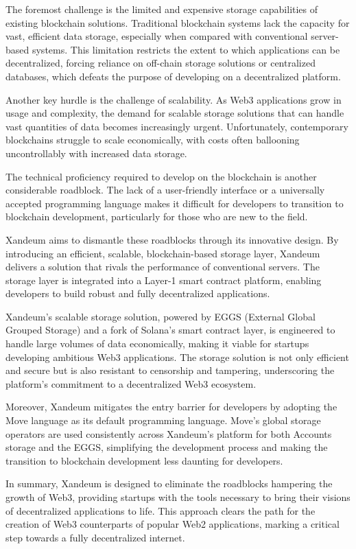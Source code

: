 \documentclass[11 pt]{article}   	%
\begin{document}
The foremost challenge is the limited and expensive storage capabilities of existing blockchain solutions. Traditional blockchain systems lack the capacity for vast, efficient data storage, especially when compared with conventional server-based systems. This limitation restricts the extent to which applications can be decentralized, forcing reliance on off-chain storage solutions or centralized databases, which defeats the purpose of developing on a decentralized platform.

Another key hurdle is the challenge of scalability. As Web3 applications grow in usage and complexity, the demand for scalable storage solutions that can handle vast quantities of data becomes increasingly urgent. Unfortunately, contemporary blockchains struggle to scale economically, with costs often ballooning uncontrollably with increased data storage.

The technical proficiency required to develop on the blockchain is another considerable roadblock. The lack of a user-friendly interface or a universally accepted programming language makes it difficult for developers to transition to blockchain development, particularly for those who are new to the field.

Xandeum aims to dismantle these roadblocks through its innovative design. By introducing an efficient, scalable, blockchain-based storage layer, Xandeum delivers a solution that rivals the performance of conventional servers. The storage layer is integrated into a Layer-1 smart contract platform, enabling developers to build robust and fully decentralized applications.

Xandeum's scalable storage solution, powered by EGGS (External Global Grouped Storage) and a fork of Solana's smart contract layer, is engineered to handle large volumes of data economically, making it viable for startups developing ambitious Web3 applications. The storage solution is not only efficient and secure but is also resistant to censorship and tampering, underscoring the platform's commitment to a decentralized Web3 ecosystem.

Moreover, Xandeum mitigates the entry barrier for developers by adopting the Move language as its default programming language. Move's global storage operators are used consistently across Xandeum's platform for both Accounts storage and the EGGS, simplifying the development process and making the transition to blockchain development less daunting for developers.

In summary, Xandeum is designed to eliminate the roadblocks hampering the growth of Web3, providing startups with the tools necessary to bring their visions of decentralized applications to life. This approach clears the path for the creation of Web3 counterparts of popular Web2 applications, marking a critical step towards a fully decentralized internet.
\end{document}
